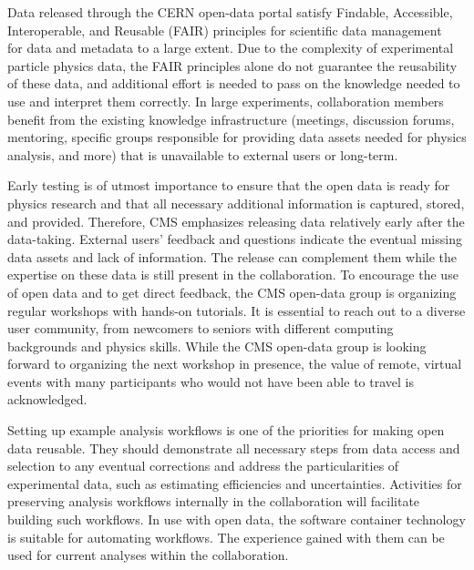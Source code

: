 \documentclass[11pt]{article}
\begin{document}
Data released through the CERN open-data portal satisfy Findable, Accessible, Interoperable, and Reusable (FAIR) principles for scientific data management~\cite{FAIR-paper} for data and metadata to a large extent. Due to the complexity of experimental particle physics data, the FAIR principles alone do not guarantee the reusability of these data, and additional effort is needed to pass on the knowledge needed to use and interpret them correctly. In large experiments, collaboration members benefit from the existing knowledge infrastructure (meetings, discussion forums, mentoring, specific groups responsible for providing data assets needed for physics analysis, and more) that is unavailable to external users or long-term. 


Early testing is of utmost importance to ensure that the open data is ready for physics research and that all necessary additional information is captured, stored, and provided. Therefore, CMS emphasizes releasing data relatively early after the data-taking. External users' feedback and questions indicate the eventual missing data assets and lack of information. The release can complement them while the expertise on these data is still present in the collaboration. To encourage the use of open data and to get direct feedback, the CMS open-data group is organizing regular workshops with hands-on tutorials. It is essential to reach out to a diverse user community, from newcomers to seniors with different computing backgrounds and physics skills. While the CMS open-data group is looking forward to organizing the next workshop in presence, the value of remote, virtual events with many participants who would not have been able to travel is acknowledged.

Setting up example analysis workflows is one of the priorities for making open data reusable. They should demonstrate all necessary steps from data access and selection to any eventual corrections and address the particularities of experimental data, such as estimating efficiencies and uncertainties. Activities for preserving analysis workflows internally in the collaboration will facilitate building such workflows. In use with open data, the software container technology is suitable for automating workflows. The experience gained with them can be used for current analyses within the collaboration.
\end{document}
